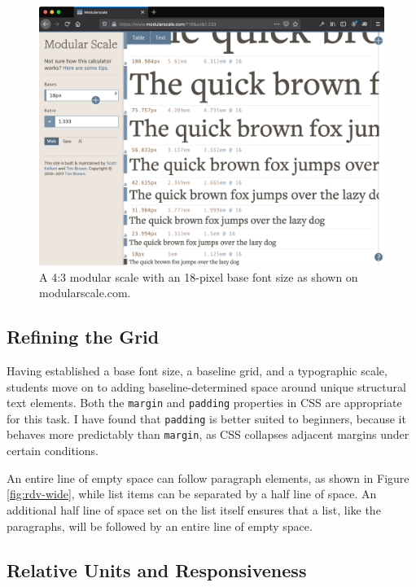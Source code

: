 \documentclass[sigplan,screen]{acmart}
\begin{document}
\begin{figure}
  \includegraphics[width=\linewidth]{modular-scale}
  \caption{A 4:3 modular scale with an 18-pixel base font size as shown on modularscale.com.}
  \label{fig:modscale}
\end{figure}


\subsection{Refining the Grid}

Having established a base font size, a baseline grid, and a typographic scale, students move on to adding baseline-determined space around unique structural text elements. Both the \verb|margin| and \verb|padding| properties in CSS are appropriate for this task. I have found that \verb|padding| is better suited to beginners, because it behaves more predictably than \verb|margin|, as CSS collapses adjacent margins under certain conditions.

An entire line of empty space can follow paragraph elements, as shown in Figure \ref{fig:rdv-wide}, while list items can be separated by a half line of space. An additional half line of space set on the list itself ensures that a list, like the paragraphs, will be followed by an entire line of empty space.

\subsection{Relative Units and Responsiveness}
\end{document}

